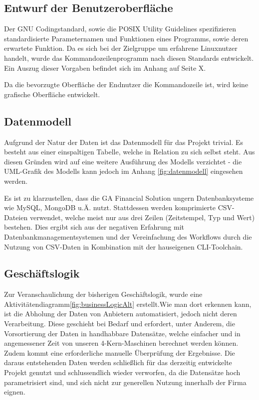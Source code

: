 

\subsection{Entwurf der Benutzeroberfläche}
Der GNU Codingstandard\cite{gnuCodingStandard},
sowie die POSIX Utility Guidelines\cite{posixGuidelines}
spezifizieren standardisierte Parameternamen und Funktionen eines Programms, sowie
deren erwartete Funktion. Da es sich bei der Zielgruppe um erfahrene Linuxnutzer handelt, wurde das Kommandozeilenprogramm nach diesen Standards entwickelt. Ein Auszug dieser Vorgaben befindet sich im Anhang auf Seite X.\par

Da die bevorzugte Oberfläche der Endnutzer die Kommandozeile ist, wird keine grafische Oberfläche entwickelt.

\subsection{Datenmodell}
Aufgrund der Natur der Daten ist das Datenmodell für das Projekt trivial. Es besteht aus einer
einspaltigen Tabelle, welche in Relation zu sich selbst steht. Aus diesen Gründen wird auf eine weitere Ausführung des 
Modells verzichtet - die UML-Grafik des Modells kann jedoch im Anhang \ref{fig:datenmodell} eingesehen werden.

Es ist zu klarzustellen, dass die GA Financial Solution ungern Datenbanksysteme wie
MySQL, MongoDB u.Ä. nutzt. Stattdessen werden komprimierte CSV-Dateien verwendet, welche
meist nur aus drei Zeilen (Zeitstempel, Typ und Wert) bestehen. Dies ergibt sich aus
der negativen Erfahrung mit Datenbankmanagementsystemen und der Vereinfachung des Workflows durch
die Nutzung von CSV-Daten in Kombination mit der hauseigenen CLI-Toolchain.


\subsection{Geschäftslogik}
Zur Veranschaulichung der bisherigen Geschäftslogik, wurde eine Aktivitätendiagramm\ref{fig:businessLogicAlt}
erstellt.Wie man dort erkennen kann, ist die Abholung der Daten von Anbietern automatisiert, jedoch nicht deren Verarbeitung.
Diese geschieht bei Bedarf und erfordert, unter Anderem, die Vorsortierung der Daten in handhabbare Datensätze, welche einfacher und in angemessener Zeit von unseren 4-Kern-Maschinen
berechnet werden können. Zudem kommt eine erforderliche manuelle Überprüfung
der Ergebnisse. Die daraus entstehenden Daten werden schließlich für das derzeitig entwickelte Projekt
genutzt und schlussendlich wieder verworfen, da die Datensätze hoch parametrisiert sind, und sich nicht zur generellen Nutzung innerhalb der Firma eignen.\par




